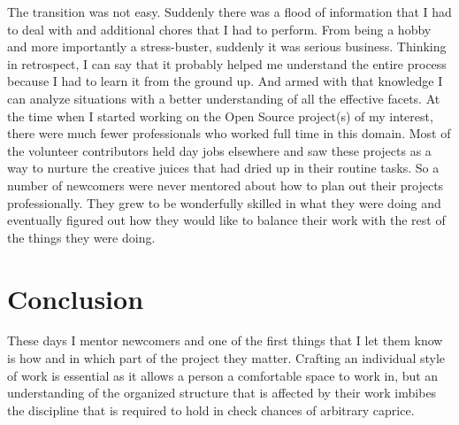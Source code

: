 The transition was not easy. Suddenly there was a flood of information that I
had to deal with and additional chores that I had to perform. From being a hobby
and more importantly a stress-buster, suddenly it was serious business. Thinking
in retrospect, I can say that it probably helped me understand the entire
process because I had to learn it from the ground up. And armed with that knowledge
I can analyze situations with a better understanding of all the effective
facets. At the time when I started working on the Open Source project(s) of my
interest, there were much fewer professionals who worked full time in this
domain. Most of the volunteer contributors held day jobs elsewhere and saw these
projects as a way to nurture the creative juices that had dried up in their
routine tasks. So a number of newcomers were never mentored about how to plan
out their projects professionally. They grew to be wonderfully skilled in what
they were doing and eventually figured out how they would like to balance their work
with the rest of the things they were doing.

\section*{Conclusion}

These days I mentor newcomers and one of the first things that I let them know
is how and in which part of the project they matter. Crafting an individual
style of work is essential as it allows a person a comfortable space to work in,
but an understanding of the organized structure that is affected by their work
imbibes the discipline that is required to hold in check chances of arbitrary
caprice.
